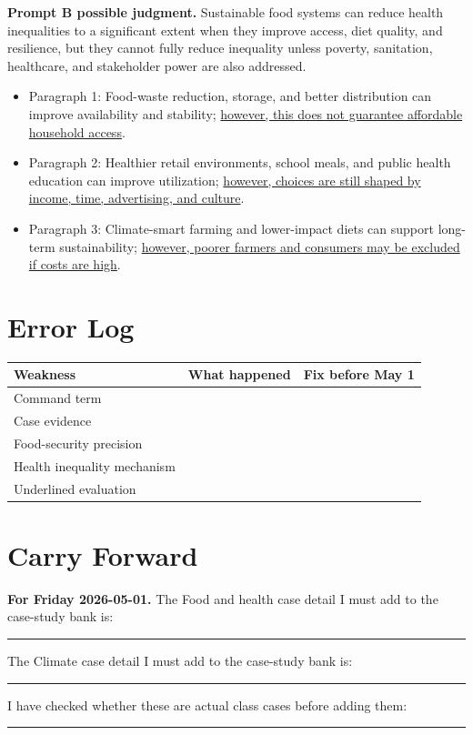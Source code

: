 \documentclass[11pt,a4paper]{article}
\begin{document}
\noindent\colorbox{SoftBlue}{%
\begin{minipage}{0.965\textwidth}
\sffamily
\textbf{\textcolor{HeadingBlue}{Prompt B possible judgment.}}
Sustainable food systems can reduce health inequalities to a significant
extent when they improve access, diet quality, and resilience, but they cannot
fully reduce inequality unless poverty, sanitation, healthcare, and stakeholder
power are also addressed.
\end{minipage}
}

\begin{itemize}
  \item Paragraph 1: Food-waste reduction, storage, and better distribution can
  improve availability and stability; \uline{however, this does not guarantee
  affordable household access}.
  \item Paragraph 2: Healthier retail environments, school meals, and public
  health education can improve utilization; \uline{however, choices are still
  shaped by income, time, advertising, and culture}.
  \item Paragraph 3: Climate-smart farming and lower-impact diets can support
  long-term sustainability; \uline{however, poorer farmers and consumers may
  be excluded if costs are high}.
\end{itemize}

\section{Error Log}

\begin{tabularx}{\textwidth}{L{0.24\textwidth}Y Y}
\toprule
\textbf{Weakness} & \textbf{What happened} & \textbf{Fix before May 1} \\
\midrule
Command term & & \\
Case evidence & & \\
Food-security precision & & \\
Health inequality mechanism & & \\
Underlined evaluation & & \\
\bottomrule
\end{tabularx}

\section{Carry Forward}

\noindent\colorbox{SoftGreen}{%
\begin{minipage}{0.965\textwidth}
\sffamily\raggedright
\textbf{\textcolor{HeadingBlue}{For Friday 2026-05-01.}}
The Food and health case detail I must add to the case-study bank is:
\rule{0.30\textwidth}{0.4pt}

The Climate case detail I must add to the case-study bank is:
\rule{0.35\textwidth}{0.4pt}

I have checked whether these are actual class cases before adding them:
\rule{0.28\textwidth}{0.4pt}
\end{minipage}
}
\end{document}
